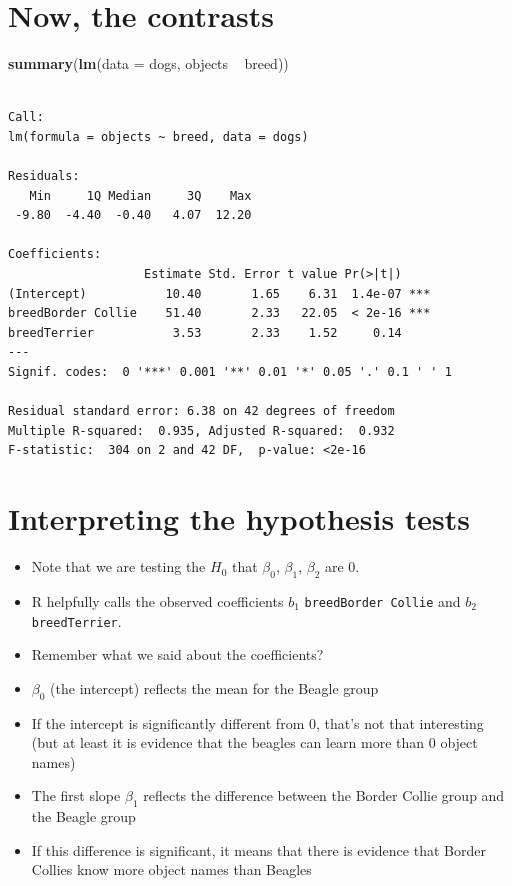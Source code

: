 \documentclass[]{article}
\newenvironment{Shaded}{}{}
\newcommand{\KeywordTok}[1]{\textcolor[rgb]{0.00,0.44,0.13}{\textbf{{#1}}}}
\newcommand{\DataTypeTok}[1]{\textcolor[rgb]{0.56,0.13,0.00}{{#1}}}
\newcommand{\StringTok}[1]{\textcolor[rgb]{0.25,0.44,0.63}{{#1}}}
\newcommand{\NormalTok}[1]{{#1}}
\begin{document}
\section{Now, the contrasts}\label{now-the-contrasts}

\begin{Shaded}
\begin{Highlighting}[]
\KeywordTok{summary}\NormalTok{(}\KeywordTok{lm}\NormalTok{(}\DataTypeTok{data =} \NormalTok{dogs, objects ~}\StringTok{ }\NormalTok{breed))}
\end{Highlighting}
\end{Shaded}

\begin{verbatim}

Call:
lm(formula = objects ~ breed, data = dogs)

Residuals:
   Min     1Q Median     3Q    Max 
 -9.80  -4.40  -0.40   4.07  12.20 

Coefficients:
                   Estimate Std. Error t value Pr(>|t|)    
(Intercept)           10.40       1.65    6.31  1.4e-07 ***
breedBorder Collie    51.40       2.33   22.05  < 2e-16 ***
breedTerrier           3.53       2.33    1.52     0.14    
---
Signif. codes:  0 '***' 0.001 '**' 0.01 '*' 0.05 '.' 0.1 ' ' 1

Residual standard error: 6.38 on 42 degrees of freedom
Multiple R-squared:  0.935, Adjusted R-squared:  0.932 
F-statistic:  304 on 2 and 42 DF,  p-value: <2e-16
\end{verbatim}

\section{Interpreting the hypothesis
tests}\label{interpreting-the-hypothesis-tests}

\begin{itemize}
\itemsep1pt\parskip0pt
\item
  Note that we are testing the $H_0$ that $\beta_0$, $\beta_1$,
  $\beta_2$ are 0.
\item
  R helpfully calls the observed coefficients $b_1$
  \texttt{breedBorder Collie} and $b_2$ \texttt{breedTerrier}.
\item
  Remember what we said about the coefficients?
\item
  $\beta_0$ (the intercept) reflects the mean for the Beagle group
\item
  If the intercept is significantly different from 0, that's not that
  interesting (but at least it is evidence that the beagles can learn
  more than 0 object names)
\item
  The first slope $\beta_1$ reflects the difference between the Border
  Collie group and the Beagle group
\item
  If this difference is significant, it means that there is evidence
  that Border Collies know more object names than Beagles
\end{itemize}
\end{document}
